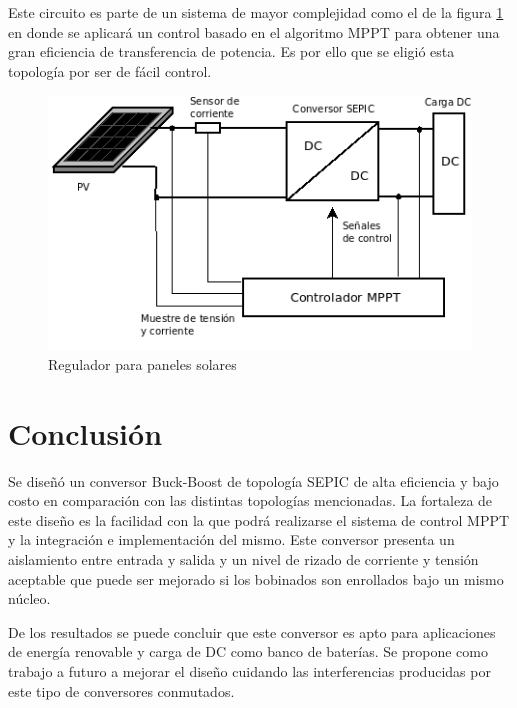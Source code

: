    Este circuito es parte de un sistema de mayor complejidad como el de la figura \ref{fig: PVControl} en donde se aplicará un control basado en el algoritmo MPPT para obtener una gran eficiencia de transferencia de potencia. Es por ello que se eligió esta topología por ser de fácil control. 
   
    \begin{figure}[htbp]
            \centering
             \includegraphics[scale = 0.35]{Figuras/Diagrama1.png}
            \caption{ Regulador para paneles solares}
            \label{fig: PVControl}
      \end{figure}

    
 
    

\section{Conclusión}


    Se diseñó un conversor Buck-Boost de topología SEPIC de alta eficiencia y bajo costo en comparación con las distintas topologías mencionadas. La fortaleza de este diseño es la facilidad con la que podrá realizarse el sistema de control MPPT y la integración e implementación del mismo. 
    Este conversor presenta un aislamiento entre entrada y salida y un nivel de rizado de corriente  y tensión aceptable que puede ser mejorado si los bobinados son enrollados bajo un mismo núcleo. 

    De los resultados se puede concluir que este conversor es apto para aplicaciones de energía renovable y carga de DC como banco de baterías.  Se propone como trabajo a futuro a mejorar el diseño cuidando las interferencias producidas por este tipo de conversores conmutados. 



\nocite{*}





